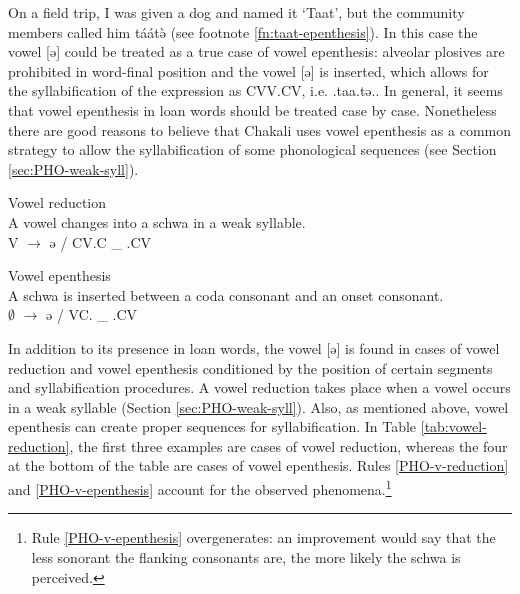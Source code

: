 On a field trip, I was given a dog  and named it  `Taat', but the community members called him {\sls táátə̀} (see footnote \ref{fn:taat-epenthesis}). In this case the  vowel  [{ə}] could be treated as a true case of vowel epenthesis: alveolar plosives are prohibited in word-final position and the   vowel  [{ə}] is  inserted, which allows for the syllabification of the expression as CVV.CV, i.e. {\sls .taa.tə.}.  In general, it seems that vowel epenthesis in loan words should be treated case by case. Nonetheless there are good reasons to believe that Chakali uses vowel epenthesis as a common strategy to allow the syllabification of  some phonological sequences (see Section \ref{sec:PHO-weak-syll}). 

\largerpage
\begin{Rule}\label{PHO-v-reduction}{Vowel reduction}\\
A vowel changes into a schwa in a weak syllable.\\
 V  $\rightarrow$ ə /  CV.C \_ .CV
\end{Rule}

\begin{Rule}\label{PHO-v-epenthesis}{Vowel epenthesis}\\
A schwa is inserted between a coda consonant and an onset consonant. \\
$\emptyset$  $\rightarrow$  ə   /  VC. \_  .CV    
\end{Rule}

In addition to its presence in loan words, the   vowel  [{ə}] is found  in cases of vowel reduction  and vowel epenthesis  conditioned by the position of certain segments and syllabification procedures. A vowel reduction takes place when a vowel occurs in a weak syllable (Section \ref{sec:PHO-weak-syll}).  Also, as  mentioned above, vowel epenthesis can create proper sequences for syllabification.  In Table \ref{tab:vowel-reduction},  the first three examples are cases of vowel reduction, whereas the four at the bottom of the table are cases of vowel epenthesis. Rules \ref{PHO-v-reduction}  and \ref{PHO-v-epenthesis} account for the observed phenomena.\footnote{Rule \ref{PHO-v-epenthesis} overgenerates: an improvement would say that the less sonorant the flanking consonants are, the more likely the schwa is perceived.} 


